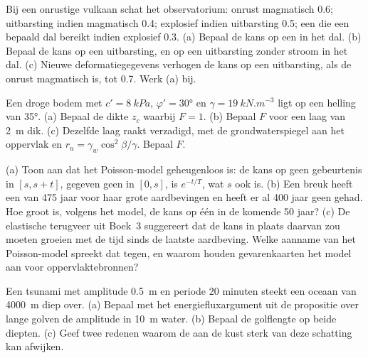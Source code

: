 \begin{exercise}[$\star\star$]\label{exo:b2:geological-hazards:8}
Bij een onrustige vulkaan schat het observatorium: onrust magmatisch 0.6; uitbarsting indien magmatisch 0.4;
explosief indien uitbarsting 0.5; een  die een bepaald dal bereikt indien explosief 0.3. (a) Bepaal
de kans op een  in het dal. (b) Bepaal de kans op een uitbarsting, en
op een uitbarsting zonder stroom in het dal. (c) Nieuwe deformatiegegevens verhogen de kans op een
uitbarsting, als de onrust magmatisch is, tot 0.7. Werk (a) bij.
\end{exercise}

\begin{exercise}[$\star\star$]\label{exo:b2:geological-hazards:9}
Een droge bodem met $c' = \qty{8}{kPa}$, $\varphi' = \ang{30}$ en $\gamma = \qty{19}{kN.m^{-3}}$ ligt op
een helling van \ang{35}. (a) Bepaal de dikte $z_c$ waarbij $F = 1$. (b) Bepaal $F$ voor een laag
van \qty{2}{m} dik. (c) Dezelfde laag raakt verzadigd, met de grondwaterspiegel aan het oppervlak en
$r_u = \gamma_w\cos^2\beta/\gamma$. Bepaal $F$.
\end{exercise}

\begin{exercise}[$\star\star\star$]\label{exo:b2:geological-hazards:10}
(a) Toon aan dat het Poisson-model geheugenloos is: de kans op geen gebeurtenis in $[s, s + t]$, gegeven
geen in $[0, s]$, is $e^{-t/T}$, wat $s$ ook is. (b) Een breuk heeft een  van 475 jaar voor haar
grote aardbevingen en heeft er al 400 jaar geen gehad. Hoe groot is, volgens het model, de kans op één
in de komende 50 jaar? (c) De elastische terugveer uit Boek~3 suggereert dat de kans
in plaats daarvan zou moeten groeien met de tijd sinds de laatste aardbeving. Welke aanname van het Poisson-model
spreekt dat tegen, en waarom houden gevarenkaarten het model aan voor oppervlaktebronnen?
\end{exercise}

\begin{exercise}[$\star\star\star$]\label{exo:b2:geological-hazards:11}
Een tsunami met amplitude \qty{0.5}{m} en periode 20 minuten steekt een oceaan van \qty{4000}{m} diep over. (a)
Bepaal met het energiefluxargument uit de propositie over lange golven de amplitude in \qty{10}{m}
water. (b) Bepaal de golflengte op beide diepten. (c) Geef twee redenen waarom de  aan de kust
sterk van deze schatting kan afwijken.
\end{exercise}

